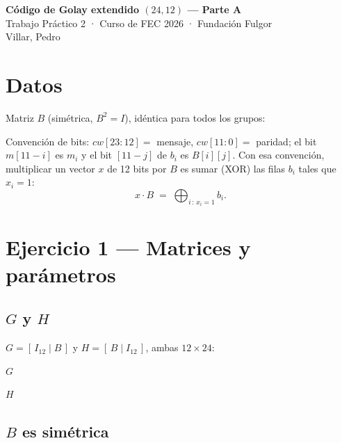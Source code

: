 \documentclass[11pt,a4paper]{article}
\begin{document}
\begin{center}
  {\large\bfseries Código de Golay extendido $(24,12)$ --- Parte A}\\[0.3ex]
  {\small Trabajo Práctico 2 · Curso de FEC 2026 · Fundación Fulgor}\\[0.3ex]
  {\small Villar, Pedro}
\end{center}


\section*{Datos}

Matriz $B$ (simétrica, $B^2=I$), idéntica para todos los grupos:

\begin{center}\small

\end{center}

Convención de bits: $cw[23{:}12]=$ mensaje, $cw[11{:}0]=$ paridad; el bit
$m[11-i]$ es $m_i$ y el bit $[11-j]$ de $b_i$ es $B[i][j]$. Con esa
convención, multiplicar un vector $x$ de 12 bits por $B$ es sumar
(XOR) las filas $b_i$ tales que $x_i=1$:
\[
  x\cdot B \;=\; \bigoplus_{i\,:\,x_i=1} b_i .
\]

\section{Ejercicio 1 --- Matrices y parámetros}

\subsection{$G$ y $H$}

$G=[\,I_{12}\mid B\,]$ y $H=[\,B\mid I_{12}\,]$, ambas $12\times 24$:

\begin{center}\small
\begin{minipage}[t]{0.47\textwidth}
  \centering $G$\\[0.6ex]
  
\end{minipage}\hfill
\begin{minipage}[t]{0.47\textwidth}
  \centering $H$\\[0.6ex]
  
\end{minipage}
\end{center}

\subsection{$B$ es simétrica}
\end{document}
